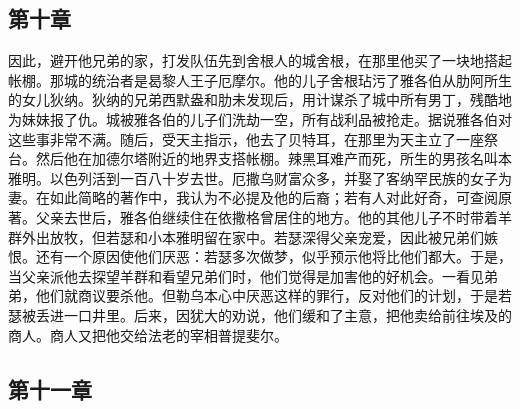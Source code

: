 
\subsection{第十章}

因此，避开他兄弟的家，打发队伍先到舍根人的城舍根，在那里他买了一块地搭起帐棚。那城的统治者是曷黎人王子厄摩尔。他的儿子舍根玷污了雅各伯从肋阿所生的女儿狄纳。狄纳的兄弟西默盎和肋未发现后，用计谋杀了城中所有男丁，残酷地为妹妹报了仇。城被雅各伯的儿子们洗劫一空，所有战利品被抢走。据说雅各伯对这些事非常不满。随后，受天主指示，他去了贝特耳，在那里为天主立了一座祭台。然后他在加德尔塔附近的地界支搭帐棚。辣黑耳难产而死，所生的男孩名叫本雅明。以色列活到一百八十岁去世。厄撒乌财富众多，并娶了客纳罕民族的女子为妻。在如此简略的著作中，我认为不必提及他的后裔；若有人对此好奇，可查阅原著。父亲去世后，雅各伯继续住在依撒格曾居住的地方。他的其他儿子不时带着羊群外出放牧，但若瑟和小本雅明留在家中。若瑟深得父亲宠爱，因此被兄弟们嫉恨。还有一个原因使他们厌恶：若瑟多次做梦，似乎预示他将比他们都大。于是，当父亲派他去探望羊群和看望兄弟们时，他们觉得是加害他的好机会。一看见弟弟，他们就商议要杀他。但勒乌本心中厌恶这样的罪行，反对他们的计划，于是若瑟被丢进一口井里。后来，因犹大的劝说，他们缓和了主意，把他卖给前往埃及的商人。商人又把他交给法老的宰相普提斐尔。\par


\subsection{第十一章}

